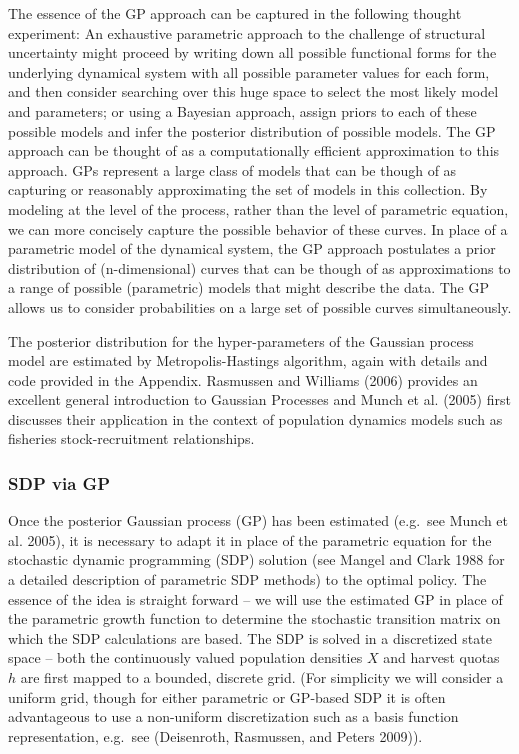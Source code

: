 \documentclass[author-year, review]{elsarticle} %
\begin{document}
The essence of the GP approach can be captured in the following thought
experiment: An exhaustive parametric approach to the challenge of
structural uncertainty might proceed by writing down all possible
functional forms for the underlying dynamical system with all possible
parameter values for each form, and then consider searching over this
huge space to select the most likely model and parameters; or using a
Bayesian approach, assign priors to each of these possible models and
infer the posterior distribution of possible models. The GP approach can
be thought of as a computationally efficient approximation to this
approach. GPs represent a large class of models that can be though of as
capturing or reasonably approximating the set of models in this
collection. By modeling at the level of the process, rather than the
level of parametric equation, we can more concisely capture the possible
behavior of these curves. In place of a parametric model of the
dynamical system, the GP approach postulates a prior distribution of
(n-dimensional) curves that can be though of as approximations to a
range of possible (parametric) models that might describe the data. The
GP allows us to consider probabilities on a large set of possible curves
simultaneously.

The posterior distribution for the hyper-parameters of the Gaussian
process model are estimated by Metropolis-Hastings algorithm, again with
details and code provided in the Appendix. Rasmussen and Williams (2006)
provides an excellent general introduction to Gaussian Processes and
Munch et al. (2005) first discusses their application in the context of
population dynamics models such as fisheries stock-recruitment
relationships.

\subsubsection{SDP via GP}

Once the posterior Gaussian process (GP) has been estimated (e.g.~see
Munch et al. 2005), it is necessary to adapt it in place of the
parametric equation for the stochastic dynamic programming (SDP)
solution (see Mangel and Clark 1988 for a detailed description of
parametric SDP methods) to the optimal policy. The essence of the idea
is straight forward -- we will use the estimated GP in place of the
parametric growth function to determine the stochastic transition matrix
on which the SDP calculations are based. The SDP is solved in a
discretized state space -- both the continuously valued population
densities $X$ and harvest quotas $h$ are first mapped to a bounded,
discrete grid. (For simplicity we will consider a uniform grid, though
for either parametric or GP-based SDP it is often advantageous to use a
non-uniform discretization such as a basis function representation,
e.g.~see (Deisenroth, Rasmussen, and Peters 2009)).
\end{document}
